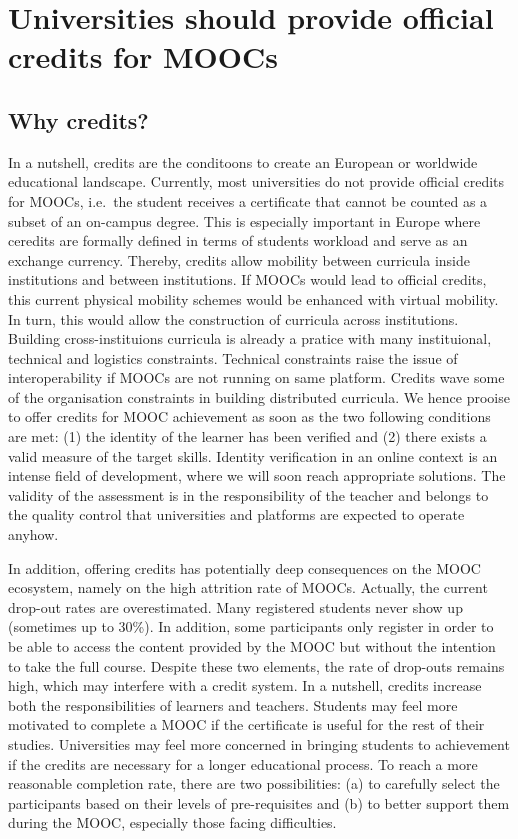 \section{Universities should provide official credits for MOOCs}
\label{sec:credit}
 
\subsection{Why credits?}

In a nutshell, credits are the conditoons to create an European or
worldwide educational landscape. 
Currently, most universities do not provide official credits for MOOCs,
i.e.\ the student receives a certificate that cannot be counted as a
subset of an on-campus degree. This is especially important in Europe where
ceredits are formally defined in terms of students workload and serve as
an exchange currency. Thereby, credits allow mobility between curricula inside
institutions and between institutions. If MOOCs would lead to official
credits, this current physical mobility schemes would be enhanced with 
virtual mobility. In turn, this would allow the construction of curricula
across institutions. Building cross-instituions curricula is already a
pratice with many instituional, technical and logistics constraints. 
Technical constraints raise the issue of interoperability if MOOCs are not
running on same platform. Credits wave some of the organisation constraints
in building distributed curricula. We hence prooise to offer  credits for 
MOOC achievement as soon as the two following conditions are met: (1) the identity of the
learner has been verified and (2) there exists a valid
measure of the target skills. Identity verification in an online context
is an intense field of development, where we will soon reach appropriate
solutions. The validity of the assessment is in the responsibility of
the teacher and belongs to the quality control that universities and
platforms are expected to operate anyhow.

In addition, offering credits has potentially deep consequences on the MOOC
ecosystem, namely on the high attrition rate of MOOCs. Actually, the
current drop-out rates are overestimated. Many registered students never
show up (sometimes up to 30\%). In addition, some participants only
register in order to be able to access the content provided by the MOOC
but without the intention to take the full course. Despite these two
elements, the rate of drop-outs remains high, which may interfere with a
credit system. In a nutshell, credits increase both the responsibilities
of learners and teachers. Students may feel more motivated to complete a
MOOC if the certificate is useful for the rest of their
studies. Universities may feel more concerned in bringing students to
achievement if the credits are necessary for a longer educational
process.  To reach a more reasonable completion rate, there are two
possibilities: (a) to carefully select the participants based on their
levels of pre-requisites and (b) to better support them during the MOOC,
especially those facing difficulties. 



